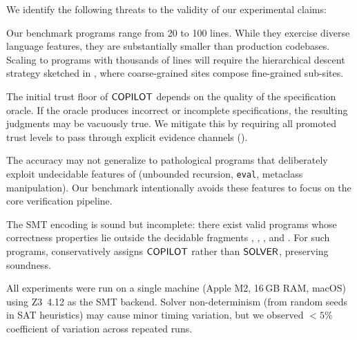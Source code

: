 We identify the following threats to the validity of our experimental
claims:

\begin{description}[leftmargin=1.5em,style=nextline]
\item[Program size.]
  Our benchmark programs range from 20 to 100 lines.  While they
  exercise diverse language features, they are substantially smaller
  than production codebases.  Scaling to programs with thousands of
  lines will require the hierarchical descent strategy sketched in
  , where coarse-grained sites compose
  fine-grained sub-sites.

\item[Oracle quality.]
  The initial trust floor of $\mathsf{COPILOT}$ depends on the quality of the
  specification oracle.  If the oracle produces incorrect or
  incomplete specifications, the resulting judgments may be vacuously
  true.  We mitigate this by requiring all promoted trust levels to
  pass through explicit evidence channels (\cf {}).

\item[Benchmark selection bias.]
  The \expAccuracy{} accuracy may not generalize to pathological
  programs that deliberately exploit undecidable features of
  \Python{} (\eg unbounded recursion, \texttt{eval},
  metaclass manipulation).  Our benchmark intentionally avoids these
  features to focus on the core verification pipeline.

\item[SMT completeness.]
  The SMT encoding is sound but incomplete: there exist valid
  \Python{} programs whose correctness properties lie outside the
  decidable fragments \QFLIA{}, \QFLRA{}, \QFBV{}, and \QFUF{}.
  For such programs, \JuGeo{} conservatively assigns $\mathsf{COPILOT}$
  rather than $\mathsf{SOLVER}$, preserving soundness.

\item[Reproducibility.]
  All experiments were run on a single machine (Apple M2, 16\,GB RAM,
  macOS) using Z3~4.12 as the SMT backend.  Solver non-determinism
  (\eg from random seeds in SAT heuristics) may cause minor timing
  variation, but we observed $<5\%$ coefficient of variation across
  repeated runs.
\end{description}

